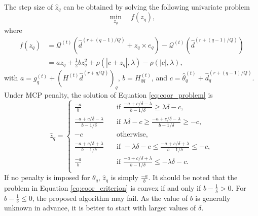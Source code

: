 \documentclass[nojss]{jss}
\begin{document}
The step size of $\hat{z}_{q}$ can be obtained by solving the following univariate problem
%
\begin{equation} \label{eq:coor_problem}
\min_{z_{q}} \quad f(z_{q}),
\end{equation}
%
where
%
\begin{equation} \label{eq:coor_criterion}
\begin{aligned}
f(z_{q}) &= \mathcal{Q}^{(t)}(\hat{d}^{(r+(q-1)/Q)} + z_{q} \times e_{q}) - \mathcal{Q}^{(t)}(\hat{d}^{(r+(q-1)/Q)}) \\
&= a z_{q} + \frac{1}{2} b z_{q}^2 + \rho(|c + z_{q}|, \lambda) -\rho(|c|, \lambda),
\end{aligned}
\end{equation}
%
with $a=g_q^{(t)}+(H^{(t)}\hat{d}^{(r+q/Q)})_q$, $b=H^{(t)}_{qq}$, and $c = \hat{\theta}_{q}^{(t)}+\hat{d}^{(r+(q-1)/Q)}_{q}$. Under MCP penalty, the solution of Equation \ref{eq:coor_problem} is
%
\begin{equation} \label{eq:coor_solution}
\hat{z}_q =
\begin{cases}
\frac{-a}{b}  & \quad \text{if }  \frac{-a + c/\delta-\lambda}{b-1/\delta} \geq \lambda \delta - c,\\
\frac{-a + c/\delta-\lambda}{b-1/\delta}  & \quad \text{if } \lambda \delta - c \geq \frac{-a + c/\delta-\lambda}{b-1/\delta} \geq -c, \\
-c  & \quad \text{otherwise,}  \\
\frac{-a + c/\delta+ \lambda}{b-1/\delta}  & \quad \text{if } - \lambda \delta - c \leq \frac{-a + c/\delta+\lambda}{b-1/\delta} \leq -c, \\
\frac{-a}{b}  & \quad \text{if }  \frac{-a + c/\delta+\lambda}{b-1/\delta} \leq -\lambda \delta - c.\\
  \end{cases}
\end{equation}
%
If no penalty is imposed for $\theta_q$, $\hat{z}_q$ is simply $\frac{-a}{b}$. It should be noted that the problem in Equation \ref{eq:coor_criterion} is convex if and only if $b - \frac{1}{\delta} > 0$. For $b - \frac{1}{\delta} \leq 0$, the proposed algorithm may fail. As the value of $b$ is generally unknown in advance, it is better to start with larger values of $\delta$. 
\end{document}
